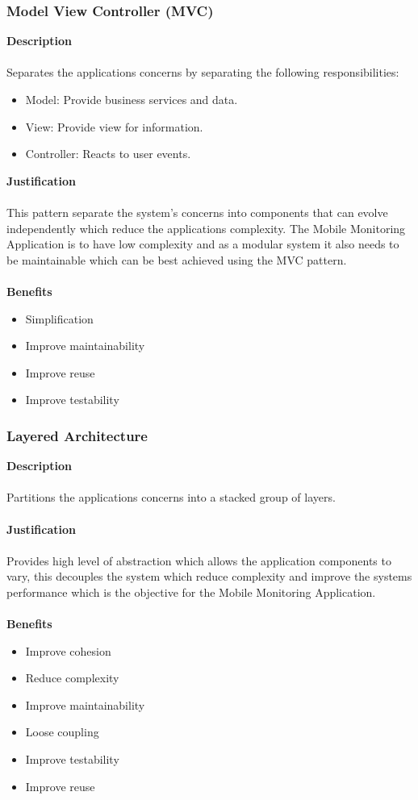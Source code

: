 \documentclass[hidelinks, 12pt, oneside]{article}
\begin{document}
    \subsubsection*{Model View Controller (MVC)}
    \textbf{Description}\\\\
    Separates the applications concerns by separating the following responsibilities:
    \begin{itemize}
    \item Model: Provide business services and data.
    \item View: Provide view for information.
    \item Controller: Reacts to user events. 
    \end{itemize}
    \textbf{Justification}\\\\
    This pattern separate the system's concerns into components that can evolve independently which reduce the applications complexity. The Mobile Monitoring Application is to have low complexity and as a modular system it also needs to be maintainable which can be best achieved using the MVC pattern. \\\\
    \textbf{Benefits}
    \begin{itemize}
    \item Simplification
    \item Improve maintainability
    \item Improve reuse
    \item Improve testability 
	\end{itemize} 
	
	\newpage
	\subsubsection{Layered Architecture}
	\textbf{Description}\\\\
	Partitions the applications concerns into a stacked group of layers.\\\\
	\textbf{Justification}\\\\
	Provides high level of abstraction which allows the application components to vary, this decouples the system which reduce complexity and improve the systems performance which is the objective for the Mobile Monitoring Application.\\\\
	\textbf{Benefits}
	\begin{itemize}
	\item Improve cohesion
	\item Reduce complexity
	\item Improve maintainability
	\item Loose coupling
	\item Improve testability
	\item Improve reuse
	\end{itemize}
	\newpage
\end{document}
